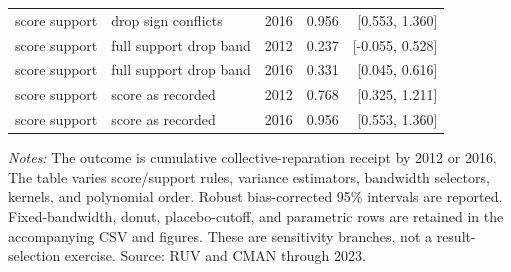 \begin{table}[!htbp]
\begin{tabular}{llrrr}
score support & drop sign conflicts & 2016 & 0.956 & [0.553, 1.360] \\
score support & full support drop band & 2012 & 0.237 & [-0.055, 0.528] \\
score support & full support drop band & 2016 & 0.331 & [0.045, 0.616] \\
score support & score as recorded & 2012 & 0.768 & [0.325, 1.211] \\
score support & score as recorded & 2016 & 0.956 & [0.553, 1.360] \\
\bottomrule
\end{tabular}
\parbox{0.97\linewidth}{\footnotesize \textit{Notes:} The outcome is cumulative collective-reparation receipt by 2012 or 2016. The table varies score/support rules, variance estimators, bandwidth selectors, kernels, and polynomial order. Robust bias-corrected 95\% intervals are reported. Fixed-bandwidth, donut, placebo-cutoff, and parametric rows are retained in the accompanying CSV and figures. These are sensitivity branches, not a result-selection exercise. Source: RUV and CMAN through 2023.}
\end{table}
